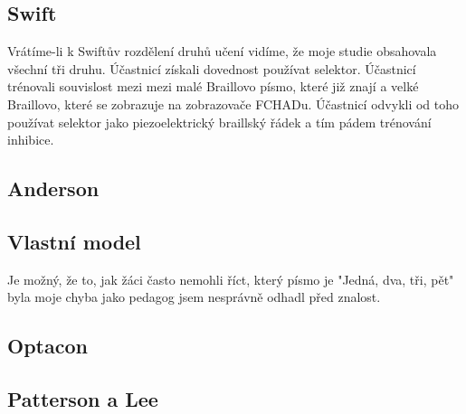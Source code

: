 \subsection{Swift}
Vrátíme-li k Swiftův rozdělení druhů učení vidíme, že moje studie obsahovala všechní tři druhu.  Účastnicí získali dovednost používat selektor.  Účastnicí trénovali souvislost mezi mezi malé Braillovo písmo, které již znají a velké Braillovo, které se zobrazuje na zobrazovače FCHADu.  Účastnicí odvykli od toho používat selektor jako piezoelektrický braillský řádek a tím pádem trénování inhibice.

\subsection{Anderson}
\subsection{Vlastní model}
Je možný, že to, jak žáci často nemohli říct, který písmo je "Jedná, dva, tři, pět" byla moje chyba jako pedagog jsem nesprávně odhadl před znalost.
\subsection{Optacon}
\subsection{Patterson a Lee}
